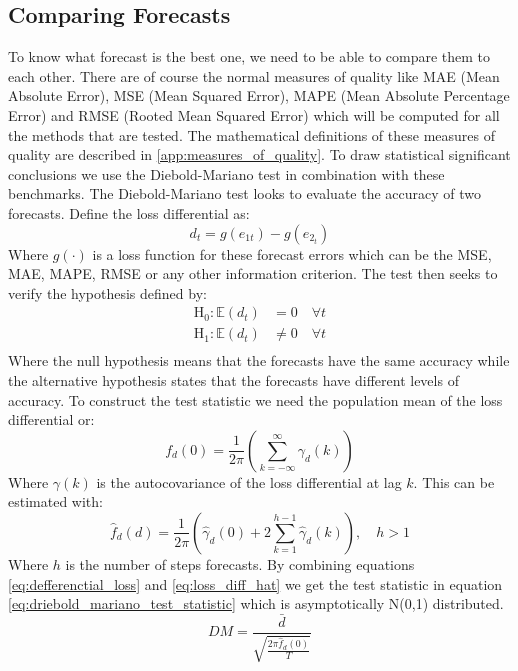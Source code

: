 \subsection{Comparing Forecasts}
To know what forecast is the best one, we need to be able to compare them to each other. There are of course the normal measures of quality like MAE (Mean Absolute Error), MSE (Mean Squared Error), MAPE (Mean Absolute Percentage Error) and RMSE (Rooted Mean Squared Error) which will be computed for all the methods that are tested. The mathematical definitions of these measures of quality are described in \autoref{app:measures_of_quality}. To draw statistical significant conclusions we use the Diebold-Mariano test \citep{Diebold1995ComparingAccuracy} in combination with these benchmarks. The Diebold-Mariano test looks to evaluate the accuracy of two forecasts. Define the loss differential as: 
\begin{equation}
    d_t = g(e_{1t}) - g(e_{2_t})
    \label{eq:defferenctial_loss}
\end{equation}
Where $g(\cdot)$ is a loss function for these forecast errors which can be the MSE, MAE, MAPE, RMSE or any other information criterion. The test then seeks to verify the hypothesis defined by:
\begin{equation*}
\begin{split}
    \text{H}_0 : \mathbb{E}(d_t) &= 0 \quad \forall t\\
    \text{H}_1 : \mathbb{E}(d_t) &\neq 0 \quad \forall t\\
\end{split}
\end{equation*}
Where the null hypothesis means that the forecasts have the same accuracy while the alternative hypothesis states that the forecasts have different levels of accuracy. To construct the test statistic we need the population mean of the loss differential or:
\begin{equation*}
    f_d(0) = \frac{1}{2\pi} \left(\sum\limits_{k=-\infty}^\infty \gamma_d(k)\right)
\end{equation*}
Where $\gamma(k)$ is the autocovariance of the loss differential at lag $k$. This can be estimated with:
\begin{equation}
    \hat{f}_d(d) = \frac{1}{2\pi} \left(\hat{\gamma}_d(0) + 2 \sum\limits_{k=1}^{h-1} \hat{\gamma}_d(k)\right), \quad h > 1
\label{eq:loss_diff_hat}
\end{equation}
Where $h$ is the number of steps forecasts. By combining equations \ref{eq:defferenctial_loss} and \ref{eq:loss_diff_hat} we get the test statistic in equation \ref{eq:driebold_mariano_test_statistic} which is asymptotically N(0,1) distributed.
\begin{equation}
    DM = \frac{\bar{d}}{\sqrt{\frac{2\pi\hat{f}_d(0)}{T}}}
    \label{eq:driebold_mariano_test_statistic}
\end{equation}